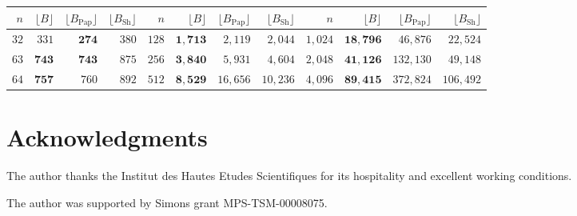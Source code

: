 \documentclass[11pt]{article}
\newtheorem{auxiliary proposition}[theorem]{Auxiliary Proposition}
\newtheorem{main conjecture}[theorem]{Main Conjecture}
\newtheorem{main theorem}[theorem]{Main Theorem}
\newtheorem{modesty proposition}[theorem]{Modesty Proposition}
\newtheorem{open problem}[theorem]{Open Problem}
\newtheorem{convergence lemma}[theorem]{Convergence Lemma}
\newtheorem{corrected lemma}[theorem]{Corrected Lemma}
\newtheorem{growth lemma}[theorem]{Growth Lemma}
\newtheorem{coefficient lemma}[theorem]{Integrality Lemma}
\newtheorem{interpolation lemma}[theorem]{Interpolation Lemma}
\newtheorem{kernel lemma}[theorem]{Kernel Lemma}
\newtheorem{limit lemma}[theorem]{Limit Lemma}
\newtheorem{tandem lemma}[theorem]{Modesty Lemma}
\newtheorem{zero-finding lemma}[theorem]{Zero-Finding Lemma}
\numberwithin{equation}{section}
\begin{document}
\begin{center}
\scriptsize
\setlength{\tabcolsep}{3pt}
\begin{tabular}{rrrr|rrrr|rrrr}
\toprule
$n$ & $\lfloor B\rfloor$ & $\lfloor B_{\mathrm{Pap}}\rfloor$ & $\lfloor B_{\mathrm{Sh}}\rfloor$ &
$n$ & $\lfloor B\rfloor$ & $\lfloor B_{\mathrm{Pap}}\rfloor$  & $\lfloor B_{\mathrm{Sh}}\rfloor$ &
$n$ & $\lfloor B\rfloor$  & $\lfloor B_{\mathrm{Pap}}\rfloor$  & $\lfloor B_{\mathrm{Sh}}\rfloor$ \\
\midrule
$32$ & $331$ & $\mathbf{274}$ & $380$
&
$128$ & $\mathbf{1{,}713}$ & $2{,}119$ & $2{,}044$
&
$1{,}024$ & $\mathbf{18{,}796}$ & $46{,}876$ & $22{,}524$ \\

$63$ & $\mathbf{743}$ & $\mathbf{743}$ & $875$
&
$256$ & $\mathbf{3{,}840}$ & $5{,}931$ & $4{,}604$
&
$2{,}048$ & $\mathbf{41{,}126}$ & $132{,}130$ & $49{,}148$ \\

$64$ & $\mathbf{757}$ & $760$ & $892$
&
$512$ & $\mathbf{8{,}529}$ & $16{,}656$ & $10{,}236$
&
$4{,}096$ & $\mathbf{89{,}415}$ & $372{,}824$ & $106{,}492$ \\
\bottomrule
\end{tabular}
\end{center}



\section*{Acknowledgments}
 The author thanks the Institut des Hautes Etudes Scientifiques for its hospitality and excellent working conditions. 
 


The author was supported by Simons grant MPS-TSM-00008075.




\end{document}
